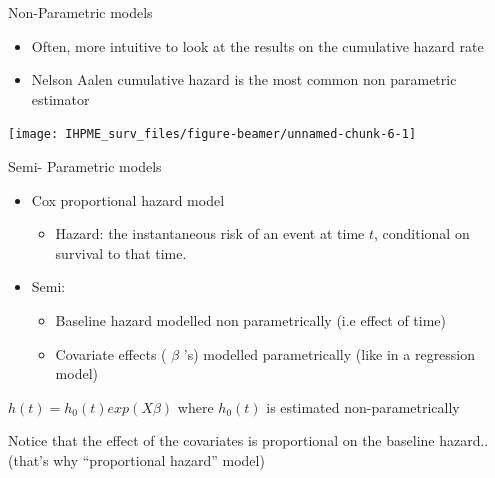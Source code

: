 \documentclass[
  ignorenonframetext,
]{beamer}
\providecommand{\tightlist}{%
  \setlength{\itemsep}{0pt}\setlength{\parskip}{0pt}}
\begin{document}
\begin{frame}{Non-Parametric models}
\protect\hypertarget{non-parametric-models-2}{}

\begin{itemize}
\tightlist
\item
  Often, more intuitive to look at the results on the cumulative hazard
  rate
\item
  Nelson Aalen cumulative hazard is the most common non parametric
  estimator
\end{itemize}

\texttt{[image: IHPME\_surv\_files/figure-beamer/unnamed-chunk-6-1]}

\end{frame}

\begin{frame}{Semi- Parametric models}
\protect\hypertarget{semi--parametric-models}{}

\begin{itemize}
\tightlist
\item
  Cox proportional hazard model

  \begin{itemize}
  \tightlist
  \item
    Hazard: the instantaneous risk of an event at time \(t\),
    conditional on survival to that time.
  \end{itemize}
\item
  Semi:

  \begin{itemize}
  \tightlist
  \item
    Baseline hazard modelled non parametrically (i.e effect of time)
  \item
    Covariate effects ( \(\beta\) 's) modelled parametrically (like in a
    regression model)
  \end{itemize}
\end{itemize}

\(h(t) = h_0(t)exp(X\beta)\) where \(h_0(t)\) is estimated
non-parametrically

Notice that the effect of the covariates is proportional on the baseline
hazard..(that's why ``proportional hazard'' model)

\end{frame}
\end{document}
